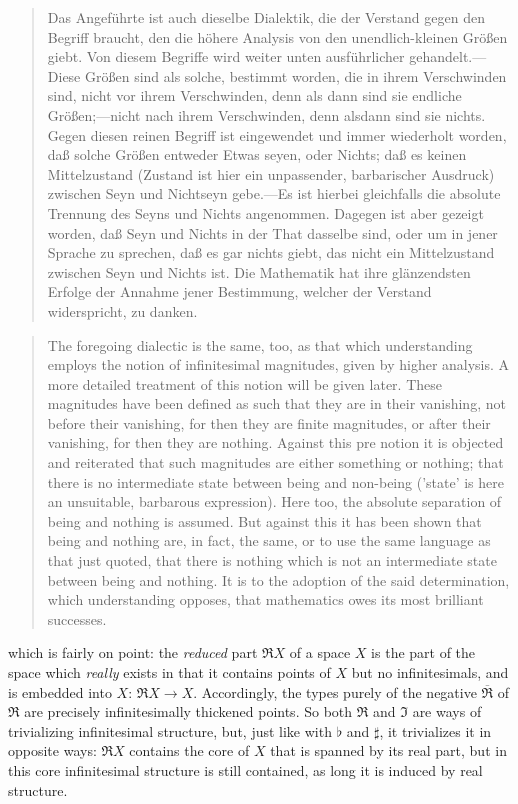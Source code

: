 \documentclass{article}
\begin{document}
\begin{quote}
    Das Angeführte ist auch dieselbe Dialektik, die der Verstand gegen den Begriff braucht, den die höhere
Analysis von den unendlich-kleinen Größen giebt. Von diesem Begriffe wird weiter unten ausführlicher gehandelt.—Diese
Größen sind als solche, bestimmt worden, die in ihrem Verschwinden sind, nicht vor ihrem Verschwinden,
denn als dann sind sie endliche Größen;—nicht nach ihrem Verschwinden, denn alsdann sind sie nichts. Gegen
diesen reinen Begriff ist eingewendet und immer wiederholt worden, daß solche Größen entweder Etwas seyen,
oder Nichts; daß es keinen Mittelzustand (Zustand ist hier ein unpassender, barbarischer Ausdruck) zwischen
Seyn und Nichtseyn gebe.—Es ist hierbei gleichfalls die absolute Trennung des Seyns und Nichts angenommen.
Dagegen ist aber gezeigt worden, daß Seyn und Nichts in der That dasselbe sind, oder um in jener Sprache
zu sprechen, daß es gar nichts giebt, das nicht ein Mittelzustand zwischen Seyn und Nichts ist. Die Mathematik
hat ihre glänzendsten Erfolge der Annahme jener Bestimmung, welcher der Verstand widerspricht, zu danken.

\end{quote}

\begin{quote}
    The foregoing dialectic is the same, too, as that which understanding employs the notion of infinitesimal
magnitudes, given by higher analysis. A more detailed treatment of this notion will be given later. These
magnitudes have been defined as such that they are in their vanishing, not before their vanishing, for
then they are finite magnitudes, or after their vanishing, for then they are nothing. Against this pre
notion it is objected and reiterated that such magnitudes are either something or nothing; that there
is no intermediate state between being and non-being ('state' is here an unsuitable, barbarous expression).
Here too, the absolute separation of being and nothing is assumed. But against this it has been shown
that being and nothing are, in fact, the same, or to use the same language as that just quoted, that there
is nothing which is not an intermediate state between being and nothing. It is to the adoption of the
said determination, which understanding opposes, that mathematics owes its most brilliant successes.
\end{quote}    

which is fairly on point: the \emph{reduced} part $\Re X$ of a space $X$ is the part of the space which
\emph{really} exists in that it contains points of $X$ but no infinitesimals, and is embedded into $X$:
$\Re X\rightarrow X$. Accordingly, the types purely of the negative $\overline{\Re}$ of $\Re$ are precisely
infinitesimally thickened points. So both $\Re$ and $\Im$ are ways of trivializing infinitesimal structure,
but, just like with $\flat$ and  $\sharp$, it trivializes it in opposite ways: $\Re X$ contains the core
of $X$ that is spanned by its real part, but in this core infinitesimal structure is still contained,
as long it is induced by real structure. 
\end{document}
